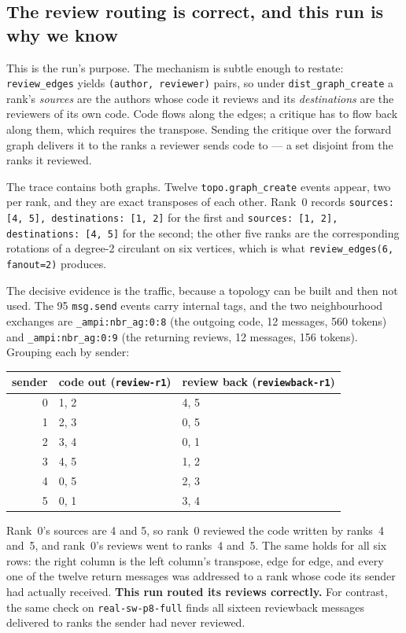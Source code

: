\documentclass[11pt]{article}
\begin{document}
\subsection*{The review routing is correct, and this run is why we know}

This is the run's purpose. The mechanism is subtle enough to restate: \texttt{review\_edges}
yields \texttt{(author, reviewer)} pairs, so under \texttt{dist\_graph\_create} a rank's
\emph{sources} are the authors whose code it reviews and its \emph{destinations} are the
reviewers of its own code. Code flows along the edges; a critique has to flow back along them,
which requires the transpose. Sending the critique over the forward graph delivers it to the
ranks a reviewer sends code to --- a set disjoint from the ranks it reviewed.

The trace contains both graphs. Twelve \texttt{topo.graph\_create} events appear, two per rank,
and they are exact transposes of each other. Rank~0 records \texttt{sources: [4, 5],
destinations: [1, 2]} for the first and \texttt{sources: [1, 2], destinations: [4, 5]} for the
second; the other five ranks are the corresponding rotations of a degree-2 circulant on six
vertices, which is what \texttt{review\_edges(6, fanout=2)} produces.

The decisive evidence is the traffic, because a topology can be built and then not used. The
95 \texttt{msg.send} events carry internal tags, and the two neighbourhood exchanges are
\texttt{\_ampi:nbr\_ag:0:8} (the outgoing code, 12 messages, 560 tokens) and
\texttt{\_ampi:nbr\_ag:0:9} (the returning reviews, 12 messages, 156 tokens). Grouping each by
sender:

\begin{center}
\begin{tabular}{@{}rll@{}}
\toprule
sender & code out (\texttt{review-r1}) & review back (\texttt{reviewback-r1}) \\
\midrule
0 & 1, 2 & 4, 5 \\
1 & 2, 3 & 0, 5 \\
2 & 3, 4 & 0, 1 \\
3 & 4, 5 & 1, 2 \\
4 & 0, 5 & 2, 3 \\
5 & 0, 1 & 3, 4 \\
\bottomrule
\end{tabular}
\end{center}

Rank~0's sources are 4 and 5, so rank~0 reviewed the code written by ranks~4 and~5, and
rank~0's reviews went to ranks~4 and~5. The same holds for all six rows: the right column is
the left column's transpose, edge for edge, and every one of the twelve return messages was
addressed to a rank whose code its sender had actually received. \textbf{This run routed its
reviews correctly.} For contrast, the same check on \texttt{real-sw-p8-full} finds all sixteen
reviewback messages delivered to ranks the sender had never reviewed.
\end{document}
